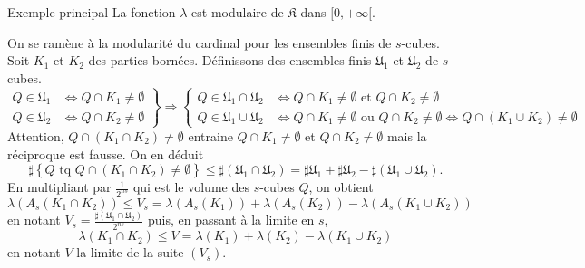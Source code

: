  \begin{propn}{Exemple principal}\label{ExplePpalModul}
  La fonction $\lambda$ est modulaire de $\mathfrak{K}$ dans $[0, + \infty[$.
 \end{propn}
 \begin{demo}
 On se ramène à la modularité du cardinal pour les ensembles finis de $s$-cubes. Soit $K_1$ et $K_2$ des parties bornées. Définissons des ensembles finis $\mathfrak{U}_1$ et $\mathfrak{U}_2$ de $s$-cubes.
 \begin{displaymath}
  \left.
  \begin{aligned}
    Q \in \mathfrak{U}_1 &\Leftrightarrow Q \cap K_1 \neq \emptyset \\
    Q \in \mathfrak{U}_2 &\Leftrightarrow Q \cap K_2 \neq \emptyset
  \end{aligned}
  \right\rbrace \Rightarrow
  \left\lbrace
  \begin{aligned}
   Q \in \mathfrak{U}_1\cap \mathfrak{U}_2 &\Leftrightarrow Q \cap K_1 \neq \emptyset \text{ et } Q \cap K_2 \neq \emptyset \\
   Q \in \mathfrak{U}_1\cup \mathfrak{U}_2 &\Leftrightarrow Q \cap K_1 \neq \emptyset \text{ ou } Q \cap K_2 \neq \emptyset \Leftrightarrow Q\cap(K_1 \cup K_2) \neq \emptyset
  \end{aligned}
  \right.
 \end{displaymath}
Attention, $Q\cap(K_1\cap K_2) \neq \emptyset$ entraine $Q \cap K_1 \neq \emptyset$ et $Q \cap K_2 \neq \emptyset$ mais la réciproque est fausse. On en déduit
\begin{displaymath}
 \sharp \left\lbrace Q \text{ tq } Q\cap(K_1\cap K_2) \neq \emptyset\right\rbrace
 \leq \sharp (\mathfrak{U}_1\cap \mathfrak{U}_2)
 = \sharp \mathfrak{U}_1 + \sharp \mathfrak{U}_2 - \sharp (\mathfrak{U}_1\cup \mathfrak{U}_2).
\end{displaymath}
En multipliant par $\frac{1}{2^{ns}}$ qui est le volume des $s$-cubes $Q$, on obtient
\begin{displaymath}
 \lambda(A_s(K_1\cap K_2))  \leq V_s = \lambda(A_s(K_1)) + \lambda(A_s(K_2)) - \lambda(A_s(K_1\cup K_2))
\end{displaymath}
en notant $V_s = \frac{\sharp (\mathfrak{U}_1\cap \mathfrak{U}_2)}{2^{ns}}$ puis, en passant à la limite en $s$,
\begin{displaymath}
 \lambda(K_1 \cap K_2) \leq V = \lambda(K_1) + \lambda(K_2) - \lambda(K_1 \cup K_2)
\end{displaymath}
en notant $V$ la limite de la suite $(V_s)$.\newline

\end{demo}

